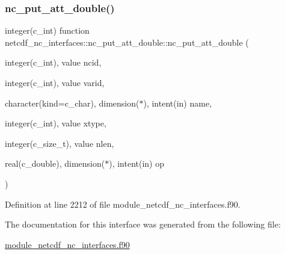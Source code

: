 \subsubsection{\texorpdfstring{nc\+\_\+put\+\_\+att\+\_\+double()}{nc\_put\_att\_double()}}
{\footnotesize\ttfamily integer(c\+\_\+int) function netcdf\+\_\+nc\+\_\+interfaces\+::nc\+\_\+put\+\_\+att\+\_\+double\+::nc\+\_\+put\+\_\+att\+\_\+double (\begin{DoxyParamCaption}\item[{integer(c\+\_\+int), value}]{ncid,  }\item[{integer(c\+\_\+int), value}]{varid,  }\item[{character(kind=c\+\_\+char), dimension($\ast$), intent(in)}]{name,  }\item[{integer(c\+\_\+int), value}]{xtype,  }\item[{integer(c\+\_\+size\+\_\+t), value}]{nlen,  }\item[{real(c\+\_\+double), dimension($\ast$), intent(in)}]{op }\end{DoxyParamCaption})}



Definition at line 2212 of file module\+\_\+netcdf\+\_\+nc\+\_\+interfaces.\+f90.



The documentation for this interface was generated from the following file\+:\begin{DoxyCompactItemize}
\item 
\hyperlink{module__netcdf__nc__interfaces_8f90}{module\+\_\+netcdf\+\_\+nc\+\_\+interfaces.\+f90}\end{DoxyCompactItemize}
